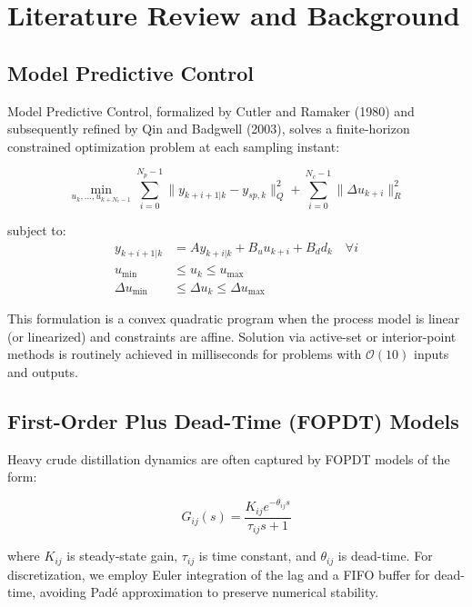 \documentclass[conference]{IEEEtran}
\begin{document}
\section{Literature Review and Background}

\subsection{Model Predictive Control}

Model Predictive Control, formalized by Cutler and Ramaker (1980) and subsequently refined by Qin and Badgwell (2003), solves a finite-horizon constrained optimization problem at each sampling instant:

\begin{equation}
\min_{u_k, \ldots, u_{k+N_c-1}} \sum_{i=0}^{N_p-1} \|y_{k+i+1|k} - y_{sp,k}\|_Q^2 + \sum_{i=0}^{N_c-1} \|\Delta u_{k+i}\|_R^2
\label{eq:mpc_obj}
\end{equation}

subject to:
\begin{align}
y_{k+i+1|k} &= A y_{k+i|k} + B_u u_{k+i} + B_d d_k \quad \forall i \\
u_{\min} &\le u_k \le u_{\max} \\
\Delta u_{\min} &\le \Delta u_k \le \Delta u_{\max}
\end{align}

This formulation is a convex quadratic program when the process model is linear (or linearized) and constraints are affine. Solution via active-set or interior-point methods is routinely achieved in milliseconds for problems with $\mathcal{O}(10)$ inputs and outputs.

\subsection{First-Order Plus Dead-Time (FOPDT) Models}

Heavy crude distillation dynamics are often captured by FOPDT models of the form:

\begin{equation}
G_{ij}(s) = \frac{K_{ij} e^{-\theta_{ij}s}}{\tau_{ij}s + 1}
\end{equation}

where $K_{ij}$ is steady-state gain, $\tau_{ij}$ is time constant, and $\theta_{ij}$ is dead-time. For discretization, we employ Euler integration of the lag and a FIFO buffer for dead-time, avoiding Padé approximation to preserve numerical stability.
\end{document}
